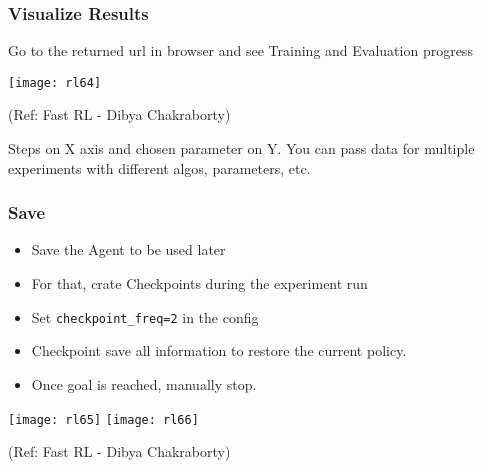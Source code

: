 \begin{frame}[fragile]\frametitle{Visualize Results}

Go to the returned url in browser and see Training and Evaluation progress


\begin{center}
\texttt{[image: rl64]}

{\tiny (Ref: Fast RL - Dibya Chakraborty)}
\end{center}

Steps on X axis and chosen parameter on Y. You can pass data for multiple experiments with different algos, parameters, etc.

\end{frame}

\begin{frame}[fragile]\frametitle{Save}

\begin{itemize}
\item Save the Agent to be used later
\item For that, crate Checkpoints during the experiment run
\item Set \lstinline|checkpoint_freq=2| in the config
\item Checkpoint save all information to restore the current policy.
\item Once goal is reached, manually stop.
\end{itemize}

\begin{center}
\texttt{[image: rl65]}
\texttt{[image: rl66]}

{\tiny (Ref: Fast RL - Dibya Chakraborty)}
\end{center}
\end{frame}

